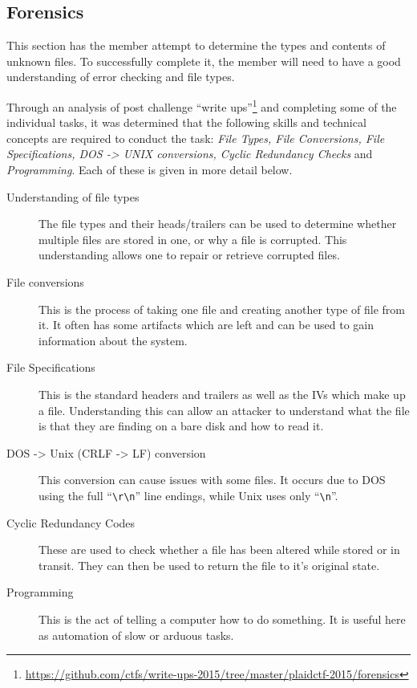 \documentclass[twoside,a4paper,11pt]{report}
\begin{document}
		\subsection{Forensics}
			This section has the member attempt to determine the types and contents of unknown files. 
			To successfully complete it, the member will need to have a good understanding of error checking and file types. 

			Through an analysis of post challenge ``write ups''\footnote{\url{https://github.com/ctfs/write-ups-2015/tree/master/plaidctf-2015/forensics}}
			and completing some of the individual tasks, 
			it was determined that the following skills and technical concepts are required to conduct the task: 
			\textit{File Types, File Conversions, File Specifications, DOS -> UNIX conversions, Cyclic Redundancy Checks} and \textit{Programming}.
			Each of these is given in more detail below. 
			\begin{description}
				\item[Understanding of file types] 
					The file types and their heads/trailers can be used to determine whether multiple files are stored in one, or why a file is corrupted. 
					This understanding allows one to repair or retrieve corrupted files.
				\item[File conversions] 
					This is the process of taking one file and creating another type of file from it. 
					It often has some artifacts which are left and can be used to gain information about the system. 
				\item[File Specifications]
					This is the standard headers and trailers as well as the IVs which make up a file. 
					Understanding this can allow an attacker to understand what the file is that they are finding on a bare disk and how to read it. 
				\item[DOS -> Unix (CRLF -> LF) conversion]
					This conversion can cause issues with some files. 
					It occurs due to DOS using the full ``\verb+\r\n+'' line endings, while Unix uses only ``\verb+\n+''. 
				\item[Cyclic Redundancy Codes]
					These are used to check whether a file has been altered while stored or in transit. 
					They can then be used to return the file to it's original state. 
				\item[Programming]
					This is the act of telling a computer how to do something. 
					It is useful here as automation of slow or arduous tasks. 
			\end{description}
\end{document}
